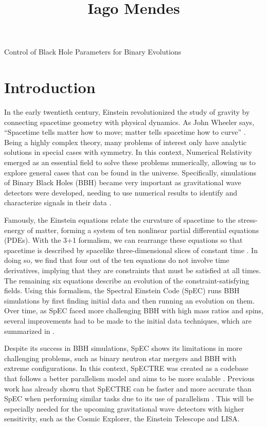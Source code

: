 \documentclass{../document}
\begin{document}
	\title
		[Caltech SURF's First Interim Report]
		{Iago Mendes}
		{Control of Black Hole Parameters for Binary Evolutions}

	\section{Introduction}

  In the early twentieth century, Einstein revolutionized the study of gravity by connecting spacetime geometry with physical dynamics. As John Wheeler says, ``Spacetime tells matter how to move; matter tells spacetime how to curve'' \cite{Wheeler}. Being a highly complex theory, many problems of interest only have analytic solutions in special cases with symmetry. In this context, Numerical Relativity emerged as an essential field to solve these problems numerically, allowing us to explore general cases that can be found in the universe. Specifically, simulations of Binary Black Holes (BBH) became very important as gravitational wave detectors were developed, needing to use numerical results to identify and characterize signals in their data \cite{LIGO}.

	Famously, the Einstein equations relate the curvature of spacetime to the stress-energy of matter, forming a system of ten nonlinear partial differential equations (PDEs). With the 3+1 formalism, we can rearrange these equations so that spacetime is described by spacelike three-dimensional slices of constant time \cite{Alcubierre}. In doing so, we find that four out of the ten equations do not involve time derivatives, implying that they are constraints that must be satisfied at all times. The remaining six equations describe an evolution of the constraint-satisfying fields. Using this formalism, the Spectral Einstein Code (SpEC) \cite{SpEC} runs BBH simulations by first finding initial data and then running an evolution on them. Over time, as SpEC faced more challenging BBH with high mass ratios and spins, several improvements had to be made to the initial data techniques, which are summarized in \cite{Serguei}.
	
	Despite its success in BBH simulations, SpEC shows its limitations in more challenging problems, such as binary neutron star mergers and BBH with extreme configurations. In this context, SpECTRE \cite{SpECTRE} was created as a codebase that follows a better parallelism model and aims to be more scalable \cite{Kidder}. Previous work has already shown that SpECTRE can be faster and more accurate than SpEC when performing similar tasks due to its use of parallelism \cite{Vu}. This will be especially needed for the upcoming gravitational wave detectors with higher sensitivity, such as the Cosmic Explorer, the Einstein Telescope and LISA.
	
\end{document}
